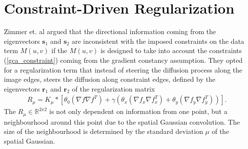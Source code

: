 \chapter{Constraint-Driven Regularization}
Zimmer et. al \cite{zimmer2011optic} argued that the directional information coming from the eigenvectors $\textbf{s}_1$ and $\textbf{s}_2$ are inconsistent with the imposed constraints on the data term $M(u,v)$ if the $M(u,v)$ is designed to take into account the constraints (\ref{gca_constraint}) coming from the gradient constancy assumption. They opted for a regularization term that instead of steering the diffusion process along the image edges, steers the diffusion along constraint edges, defined by the eigenvectors $\textbf{r}_1$ and $\textbf{r}_2$ of the regularization matrix
\begin{align}
R_{\mu} = K_{\mu} * \left[ \theta_0(\nabla f \nabla f^T) + \gamma \left( \theta_x(\nabla f_x \nabla f_x^T) + \theta_y(\nabla f_y \nabla f_y^T) \right) \right].
\end{align}
The $R_{\mu} \in \mathbb{R}^{2x2}$ is not only dependent on information from one point, but a neighbourhood around this point due to the spatial Gaussian convolution. The size of the neighbourhood is determined by the standard deviation $\mu$ of the spatial Gaussian. 